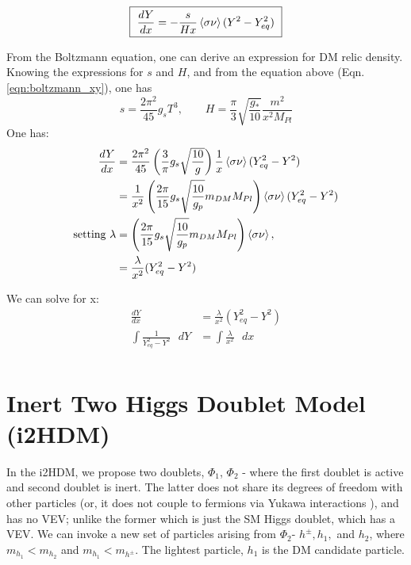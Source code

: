 \documentclass[12pt]{article}
\begin{document}
\begin{equation}
    \boxed{\text{ }\frac{dY}{dx} = -\frac{s}{Hx}\braket{\sigma\nu}(Y^2 - Y^2_{eq})\text{ }}
    \label{eqn:boltzmann_xy}
\end{equation}

From the Boltzmann equation, one can derive an expression for DM relic density. Knowing the expressions for $s$ and $H$, and from the equation above (Eqn. \ref{eqn:boltzmann_xy}), one has
\begin{equation}
    s = \frac{2 \pi^2}{45}{g_s}T^3, \qquad 
    H = \frac{\pi}{3}\sqrt{\frac{g_*}{10}}\frac{m^2}{x^2 M_{Pl}}
\end{equation}
One has:
\begin{equation}
    \begin{split}
        \frac{dY}{dx} &= \frac{2\pi^2}{45}\left(\frac{3}{\pi}g_s\sqrt{\frac{10}{g}}\right)\frac{1}{x}\braket{\sigma \nu}(Y_{eq}^2 - Y^2) \\
        &= \frac{1}{x^2}\left(\frac{2 \pi}{15}g_s\sqrt{\frac{10}{g_p}}m_{DM}M_{Pl}\right)\braket{\sigma \nu}(Y_{eq}^2 - Y^2) \\
        \text{setting } \lambda &= \left(\frac{2 \pi}{15}g_s\sqrt{\frac{10}{g_p}}m_{DM}M_{Pl}\right)\braket{\sigma \nu}, \\
        &= \frac{\lambda}{x^2}(Y_{eq}^2 - Y^2)
    \end{split}
\end{equation}

We can solve for x:
\begin{equation}
    \begin{split}
        \frac{dY}{dx} &= \frac{\lambda}{x^2} (Y_{eq}^2 - Y^2)
        \\\int \frac{1}{Y_{eq}^2 - Y^2}\text{ } dY &= \int\frac{\lambda}{x^2}\text{ } dx
        \\ 
    \end{split}
\end{equation}
\section{Inert Two Higgs Doublet Model (i2HDM)}
\label{sec:i2HDM}
In the i2HDM, we propose two doublets, $\Phi_1$, $\Phi_2$ - where the first doublet is active and second doublet is inert. The latter does not share its degrees of freedom with other particles (or, it does not couple to fermions via Yukawa interactions \cite{Belyaev_2022}), and has no VEV; unlike the former which is just the SM Higgs doublet, which has a VEV. We can invoke a new set of particles arising from $\Phi_2$- $h^\pm, h_1,$ and $h_2$, where $m_{h_1} < m_{h_2}$ and $m_{h_1} < m_{h^\pm}$. The lightest particle, $h_1$ is the DM candidate particle.
\end{document}
